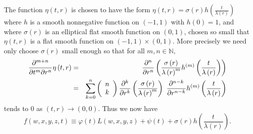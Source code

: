 \documentclass{amsart}
\theoremstyle{plain}
\numberwithin{equation}{section}
\begin{document}
The function $\eta \left( t,r\right) $ is chosen to have the form $\eta
\left( t,r\right) =\sigma \left( r\right) h\left( \frac{t}{\lambda \left(
r\right) }\right) $ where $h$ is a smooth nonnegative function on $\left(
-1,1\right) $ with $h\left( 0\right) =1$, and where $\sigma \left( r\right) $
is an elliptical flat smooth function on $\left( 0,1\right) $, chosen so
small that $\eta \left( t,r\right) $ is a flat smooth function on $\left(
-1,1\right) \times \left( 0,1\right) $. More precisely we need only choose $%
\sigma \left( r\right) $ small enough so that for all $m,n\in \mathbb{N}$,%
\begin{eqnarray}
\frac{\partial ^{m+n}}{\partial t^{m}\partial r^{n}}\eta \left( t,r\right)
&=&\frac{\partial ^{n}}{\partial r^{n}}\left( \frac{\sigma \left( r\right) }{%
\lambda \left( r\right) ^{m}}h^{\left( m\right) }\left( \frac{t}{\lambda
\left( r\right) }\right) \right)  \label{der est} \\
&=&\sum_{k=0}^{n}\left( 
\begin{array}{c}
n \\ 
k%
\end{array}%
\right) \frac{\partial ^{k}}{\partial r^{k}}\left( \frac{\sigma \left(
r\right) }{\lambda \left( r\right) ^{m}}\right) \ \frac{\partial ^{n-k}}{%
\partial r^{n-k}}h^{\left( m\right) }\left( \frac{t}{\lambda \left( r\right) 
}\right)  \notag
\end{eqnarray}%
tends to $0$ as $\left( t,r\right) \rightarrow \left( 0,0\right) $. Thus we
now have%
\begin{equation}
f\left( w,x,y,z,t\right) \equiv \varphi \left( t\right) L\left(
w,x,y,z\right) +\psi \left( t\right) +\sigma \left( r\right) h\left( \frac{t%
}{\lambda \left( r\right) }\right) .  \label{def f'}
\end{equation}
\end{document}
